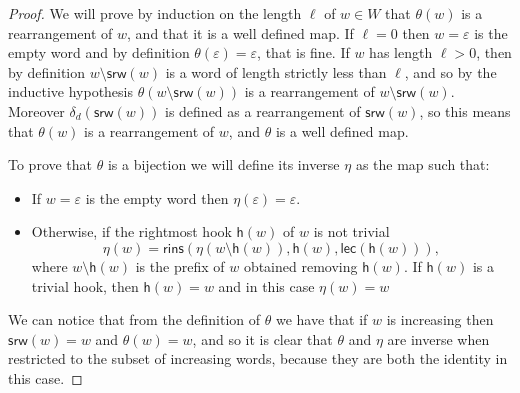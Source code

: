 \documentclass[a4paper]{amsart}
\newcommand{\des}{\mathsf{des}}
\newcommand{\lec}{\mathsf{lec}}
\newcommand{\srw}{\mathsf{srw}}
\newcommand{\rins}{\mathsf{rins}}
\newcommand{\h}{\mathsf{h}}
\newcommand{\wv}{\mathsf{wv}}
\theoremstyle{definition}
\theoremstyle{remark}
\numberwithin{equation}{section}
\begin{document}
\begin{proof}
We will prove by induction on the length $\ell$ of $w\in W$ that $\theta(w)$ is a rearrangement of $w$, and that it is a well defined map. If $\ell=0$ then $w=\varepsilon$ is the empty word and by definition $\theta(\varepsilon)=\varepsilon$, that is fine. If $w$ has length $\ell>0$, then by definition $w\setminus\srw(w)$ is a word of length strictly less than $\ell$, and so by the inductive hypothesis $\theta(w\setminus\srw(w))$ is a rearrangement of $w\setminus\srw(w)$. Moreover $\delta_d(\srw(w))$ is defined as a rearrangement of $\srw(w)$, so this means that $\theta(w)$ is a rearrangement of $w$, and $\theta$ is a well defined map.

To prove that $\theta$ is a bijection we will define its inverse $\eta$ as the map such that:
\begin{itemize}
    \item If $w=\varepsilon$ is the empty word then $\eta(\varepsilon)=\varepsilon$.
    \item Otherwise, if the rightmost hook $\h(w)$ of $w$ is not trivial
    \begin{equation}
        \eta(w)=\rins(\eta(w\setminus \h(w)),\h(w),\lec(\h(w))),
    \end{equation}
    where $w\setminus \h(w)$ is the prefix of $w$ obtained removing $\h(w)$. If $\h(w)$ is a trivial hook, then $\h(w)=w$ and in this case $\eta(w)=w$
\end{itemize}


We can notice that from the definition of $\theta$ we have that if $w$ is increasing then $\srw(w)=w$ and $\theta(w)=w$, and so it is clear that $\theta$ and $\eta$ are inverse when restricted to the subset of increasing words, because they are both the identity in this case.


\end{proof}
\end{document}
